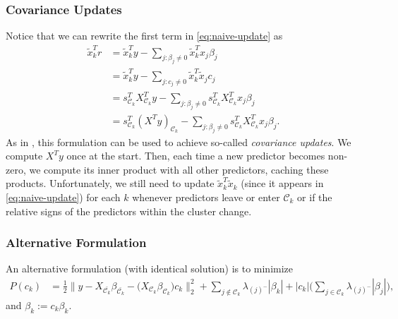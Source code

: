 \subsubsection{Covariance Updates}

Notice that we can rewrite the first term in \eqref{eq:naive-update} as
\begin{equation}
  \begin{aligned}
    \tilde x_k^T r & = \tilde x_k^T y - \sum_{j : \beta_j \neq 0} \tilde x_k^T x_j \beta_j                                                                     \\
                   & = \tilde x_k^T y - \sum_{j : c_j \neq 0} \tilde x_k^T \tilde x_j c_j                                                                      \\
                   & = s_{\mathcal{C}_k}^T X_{\mathcal{C}_k}^T y - \sum_{j : \beta_j \neq 0} s_{\mathcal{C}_k}^T X_{\mathcal{C}_k}^T x_j \beta_j               \\
                   & = s_{\mathcal{C}_k}^T \left(X^T y\right)_{\mathcal{C}_k} - \sum_{j : \beta_j \neq 0} s_{\mathcal{C}_k}^T X_{\mathcal{C}_k}^T x_j \beta_j.
  \end{aligned}
\end{equation}
As in \textcite{friedman2010}, this formulation can be used to achieve so-called \emph{covariance updates}.
We compute \(X^T y\) once at the start.
Then, each time a new predictor becomes non-zero, we compute its inner product with all other predictors, caching these products.
Unfortunately, we still need to update \(\tilde x^T_k \tilde x_k\) (since it appears in \eqref{eq:naive-update}) for each \(k\) whenever predictors leave or enter \(\mathcal{C}_k\) or if the relative signs of the predictors within the cluster change.

\subsubsection{Alternative Formulation}

An alternative formulation (with identical solution) is to minimize
\[
  \begin{aligned}
    P(c_k) & = \frac{1}{2} \lVert y - X_{\bar{\mathcal{C}_k}} \beta_{\bar{\mathcal{C}_k}} - \big(X_{\mathcal{C}_k} \beta_{\mathcal{C}_k}\big)c_k  \rVert_2^2 + \sum_{j \notin {\mathcal{C}_k}} \lambda_{(j)^-}|\beta_k| + |c_k|\bigg(\sum_{j \in {\mathcal{C}_k}} \lambda_{(j)^- }|\beta_j|\bigg),
  \end{aligned}
\]
and \(\beta_k := c_k\beta_k\).

